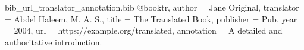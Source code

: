 \begin{filecontents*}[overwrite]{bib_url_translator_annotation.bib}
@book{tr,
  author = {Jane Original},
  translator = {Abdel Haleem, M. A. S.},
  title = {The Translated Book},
  publisher = {Pub},
  year = {2004},
  url = {https://example.org/translated},
  annotation = {A detailed and authoritative introduction.}
}
\end{filecontents*}
\documentclass{article}
\usepackage{biblatex}


See \cite{tr}.
\printbibliography

